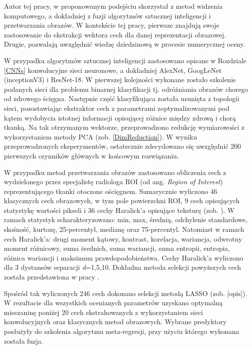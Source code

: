 Autor tej pracy, w proponowanym podejściu skorzystał z metod widzenia komputowego, a dokładniej z fuzji algorytmów sztucznej inteligencji i przetwarzania obrazów. W kontekście tej pracy, pierwsze znajdują swoje zastosowanie do ekstrakcji wektora cech dla danej reprezentacji obrazowej. Drugie, pozwalają uwzględnić wiedzę dziedzinową w procesie numerycznej oceny.

W przypadku algorytmów sztucznej inteligencji zastosowano  opisane w Rozdziale \ref{CNNs} konwolucyjne sieci neuronowe, a dokładniej AlexNet, GoogLeNet (inceptionV3) i ResNet-18. W pierwszej kolejności wykonane zostało szkolenie podanych sieci dla problemu binarnej klasyfikacji tj. odróżniania obrazów chorego od zdrowego ścięgna. Następnie część klasyfikująca została usunięta z topologii sieci, pozostawiając ekstraktor cech z parametrami zoptymalizowanymi pod kątem wydobycia istotnej informacji opisującej różnice między zdrową i chorą tkanką. Na tak otrzymanym wektorze, przeprowadzono redukcję wymiarowości z wykorzystaniem metody PCA (zob. \ref{DimReduction}). W wyniku przeprowadzonych eksperymentów, ostatecznie zdecydowano się uwzględnić 200 pierwszych czynników głównych w końcowym rozwiązaniu.

W przypadku metod przetwarzania obrazów zastosowano obliczenia cech z wydzielonego przez specjalistę radiologa ROI (od ang. \textit{Region of Interest}) reprezentującego tkanki otoczone ościęgnem. Sumarycznie wyliczono 46 klasycznych cech obrazowych, w tym pole powierzchni ROI, 9 cech opisujących statystykę wartości pikseli i 36 cechy Haralick'a opisujące teksturę (zob. \cite{Haralick1973}). W ramach statystyk scharakteryzowano: min, max, średnią, odchylenie standardowe, skośność, kurtozę, 25-percentyl, medianę oraz 75-percentyl. Natomiast w ramach cech Haralick'a: drugi moment kątowy, kontrast, korelacja, wariancja, odwrotny moment różnicowy, suma średnich, suma wariancji, suma entropii, entropia, różnica wariancji i maksimum prawdopodobieństwa. Cechy Haralick'a wyliczono dla 3 dystansów separacji \textit{d}=1,5,10. Dokładna metoda selekcji powyższych cech została przedstawiona w pracy  \cite{Nowosielski17}.  

Spośród tak wyliczonych 246 cech dokonano selekcji metodą LASSO (zob. [opis]). W rezultacie dla wszystkich ocenianych parametrów uzyskano optymalną mieszaninę poniżej 20 cech ekstrahowanych z wykorzystaniem sieci konwolucyjnych oraz klasycznych metod obrazowych. Wybrane predyktory posłużyły do szkolenia algorytmu meta-regresji, przy użyciu którego wykonana została fuzja.   

